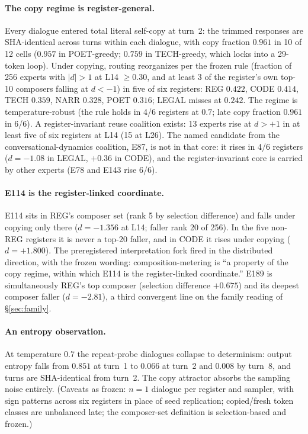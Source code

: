 \documentclass[10pt,a4paper,twocolumn]{article}
\begin{document}
\paragraph{The copy regime is register-general.}
Every dialogue entered total literal self-copy at turn~2: the trimmed
responses are SHA-identical across turns within each dialogue, with copy
fraction $0.961$ in 10 of 12 cells ($0.957$ in POET-greedy; $0.759$ in
TECH-greedy, which locks into a 29-token loop). Under copying, routing
reorganizes per the frozen rule (fraction of 256 experts with $|d|{>}1$ at
L14 $\ge 0.30$, and at least 3 of the register's own top-10 composers falling
at $d{<}{-}1$) in five of six registers: REG $0.422$, CODE $0.414$, TECH
$0.359$, NARR $0.328$, POET $0.316$; LEGAL misses at $0.242$. The regime is
temperature-robust (the rule holds in 4/6 registers at $0.7$; late copy
fraction $0.961$ in 6/6). A register-invariant reuse coalition exists: 13
experts rise at $d{>}{+}1$ in at least five of six registers at L14 (15 at
L26). The named candidate from the conversational-dynamics coalition, E87, is
not in that core: it rises in 4/6 registers ($d{=}{-}1.08$ in LEGAL, $+0.36$
in CODE), and the register-invariant core is carried by other experts (E78
and E143 rise 6/6).

\paragraph{E114 is the register-linked coordinate.}
E114 sits in REG's composer set (rank 5 by selection difference) and falls
under copying only there ($d{=}{-}1.356$ at L14; faller rank 20 of 256). In
the five non-REG registers it is never a top-20 faller, and in CODE it rises
under copying ($d{=}{+}1.800$). The preregistered interpretation fork fired
in the distributed direction, with the frozen wording: composition-metering
is ``a property of the copy regime, within which E114 is the register-linked
coordinate.'' E189 is simultaneously REG's top composer (selection difference
$+0.675$) and its deepest composer faller ($d{=}{-}2.81$), a third convergent
line on the family reading of \S\ref{sec:family}.

\paragraph{An entropy observation.}
At temperature $0.7$ the repeat-probe dialogues collapse to determinism:
output entropy falls from $0.851$ at turn~1 to $0.066$ at turn~2 and $0.008$
by turn~8, and turns are SHA-identical from turn~2. The copy attractor
absorbs the sampling noise entirely. (Caveats as frozen: $n{=}1$ dialogue per
register and sampler, with sign patterns across six registers in place of
seed replication; copied/fresh token classes are unbalanced late; the
composer-set definition is selection-based and frozen.)
\end{document}
